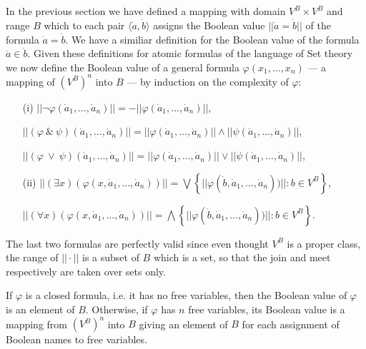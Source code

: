 \subsection{}
In the previous section we have defined a mapping with domain $V^B\times V^B$ and range $B$ which to each pair $\langle\dot{a},\dot{b}\rangle$
assigns the Boolean value $||\dot{a}=\dot{b}||$ of the formula $\dot{a}=\dot{b}$. We have a similiar definition for the Boolean value of
the formula $\dot{a}\in\dot{b}$. Given these definitions for atomic formulas of the language of Set theory we now define the Boolean
value of a general formula $\varphi(x_1,\ldots,x_n)$ --- a mapping of $(V^B)^n$ into $B$ --- by induction on the complexity of $\varphi$:
\begin{itemize}
 \item[(i)]  $||\neg \varphi(\dot{a}_1,\ldots,\dot{a}_n) || = - ||\varphi(\dot{a}_1,\ldots,\dot{a}_n) ||$,
 \item[]     $||(\varphi\ \&\ \psi)(\dot{a}_1,\ldots,\dot{a}_n)||=
              ||\varphi(\dot{a}_1,\ldots,\dot{a}_n)|| \wedge ||\psi(\dot{a}_1,\ldots,\dot{a}_n)||$,
 \item[]     $||(\varphi\ \vee\ \psi)(\dot{a}_1,\ldots,\dot{a}_n)||=
              ||\varphi(\dot{a}_1,\ldots,\dot{a}_n)|| \vee ||\psi(\dot{a}_1,\ldots,\dot{a}_n)||$,
 \item[(ii)] $||(\exists x)(\varphi(x,\dot{a}_1,\ldots,\dot{a}_n))||=\bigvee\left\{ ||\varphi(\dot{b},\dot{a}_1,\ldots,\dot{a}_n))||:b\in V^B\right\}$,
 \item[]  $||(\forall x)(\varphi(x,\dot{a}_1,\ldots,\dot{a}_n))||=\bigwedge\left\{ ||\varphi(\dot{b},\dot{a}_1,\ldots,\dot{a}_n))||:b\in V^B\right\}$.
\end{itemize}

The last two formulas are perfectly valid since even thought $V^B$ is a proper class, the range of $||\cdot||$ is a subset of $B$ which is a set, so that
the join and meet respectively are taken over sets only.

\begin{note} If $\varphi$ is a closed formula, i.e. it has no free variables, then the Boolean value of $\varphi$ is an element of $B$. Otherwise, if $\varphi$
             has $n$ free variables, its Boolean value is a mapping from $(V^B)^n$ into $B$ giving an element of $B$ for each assignment of Boolean names to
             free variables.
\end{note}

